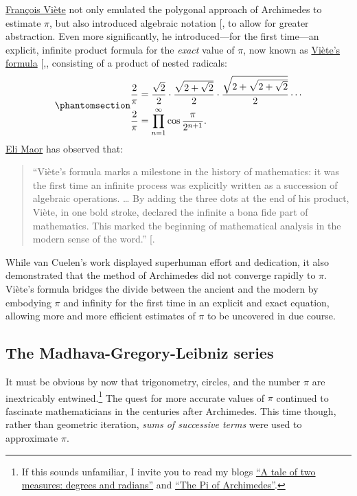\documentclass[
  a4paper,
]{article}
\begin{document}
\href{https://en.wikipedia.org/wiki/Fran\%C3\%A7ois_Vi\%C3\%A8te}{François
Viète} not only emulated the polygonal approach of Archimedes to
estimate \(\pi\), but also introduced algebraic notation
{[},\citeproc{ref-maor1998}{15}{]} to allow for
greater abstraction. Even more significantly, he introduced---for the
first time---an explicit, infinite product formula for the \emph{exact}
value of \(\pi\), now known as
\href{https://en.wikipedia.org/wiki/Vi\%C3\%A8te\%27s_formula}{Viète's
formula}
{[},\citeproc{ref-viete-formula}{16}{]},
consisting of a product of nested radicals:
\begin{equation}\phantomsection\label{eq:viete}{
\begin{aligned}
\frac2\pi &= \frac{\sqrt 2}2 \cdot \frac{\sqrt{2+\sqrt 2}}2 \cdot \frac{\sqrt{2+\sqrt{2+\sqrt 2}}}2 \cdots\\
\frac2\pi &= \prod_{n=1}^{\infty} \cos \frac{\pi}{2^{n+1}}.
\end{aligned}
}\end{equation} \href{https://en.wikipedia.org/wiki/Eli_Maor}{Eli Maor}
has observed that:

\begin{quote}
``Viète's formula marks a milestone in the history of mathematics: it
was the first time an infinite process was explicitly written as a
succession of algebraic operations. \ldots{} By adding the three dots at
the end of his product, Viète, in one bold stroke, declared the infinite
a bona fide part of mathematics. This marked the beginning of
mathematical analysis in the modern sense of the word.''
{[}\citeproc{ref-maor1998}{15}{]}.
\end{quote}

While van Cuelen's work displayed superhuman effort and dedication, it
also demonstrated that the method of Archimedes did not converge rapidly
to \(\pi\). Viète's formula bridges the divide between the ancient and
the modern by embodying \(\pi\) and infinity for the first time in an
explicit and exact equation, allowing more and more efficient estimates
of \(\pi\) to be uncovered in due course.

\subsection{The Madhava-Gregory-Leibniz
series}\label{the-madhava-gregory-leibniz-series}

It must be obvious by now that trigonometry, circles, and the number
\(\pi\) are inextricably entwined.\footnote{If this sounds unfamiliar, I
  invite you to read my blogs
  \href{https://swanlotus.netlify.app/blogs/a-tale-of-two-measures-degrees-and-radians}{``A
  tale of two measures: degrees and radians''} and
  \href{https://swanlotus.netlify.app/blogs/the-pi-of-archimedes}{``The
  Pi of Archimedes''}.} The quest for more accurate values of \(\pi\)
continued to fascinate mathematicians in the centuries after Archimedes.
This time though, rather than geometric iteration, \emph{sums of
successive terms} were used to approximate \(\pi\).
\end{document}
